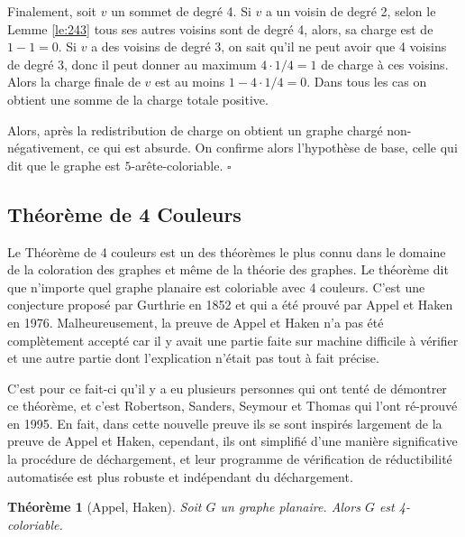 \documentclass[10pt,a4paper]{article}
\newtheorem{theorem}{Théorème}
\newcommand{\ep}{{\hfill $\square$}}
\begin{document}
Finalement, soit $v$ un sommet de degré 4. Si $v$ a un voisin de degré 2, selon le Lemme \ref{le:243} tous ses autres voisins sont de degré 4, alors, sa charge est de $1-1=0$. Si $v$ a des voisins de degré 3, on sait qu'il ne peut avoir que 4 voisins de degré 3, donc il peut donner au maximum $4 \cdot 1/4=1$ de charge à ces voisins. Alors la charge finale de $v$ est au moins $1 - 4\cdot 1/4 = 0$. Dans tous les cas on obtient une somme de la charge totale positive.

Alors, après la redistribution de charge on obtient un graphe chargé non-négativement, ce qui est absurde. On confirme alors l'hypothèse de base, celle qui dit que le graphe est $5$-arête-coloriable.
\ep 


\subsection{Théorème de 4 Couleurs}

Le Théorème de 4 couleurs est un des théorèmes le plus connu dans le domaine de la coloration des graphes et même de la théorie des graphes. Le théorème dit que n'importe quel graphe planaire est coloriable avec 4 couleurs. C'est une conjecture proposé par Gurthrie en 1852 et qui a été prouvé par Appel et Haken \cite{A&H} en 1976. Malheureusement, la preuve de Appel et Haken n'a pas été complètement accepté car il y avait une partie faite sur machine difficile à vérifier et une autre partie dont l'explication n'était pas tout à fait précise.

C'est pour ce fait-ci qu'il y a eu plusieurs personnes qui ont tenté de démontrer ce théorème, et c'est Robertson, Sanders, Seymour et Thomas \cite{T4C} qui l'ont ré-prouvé en 1995. En fait, dans cette nouvelle preuve ils se sont inspirés largement de la preuve de Appel et Haken, cependant, ils ont simplifié d'une manière significative la procédure de déchargement, et leur programme de vérification de réductibilité automatisée est plus robuste et indépendant du déchargement.

\begin{theorem}[Appel, Haken]
Soit $G$ un graphe planaire. Alors $G$ est 4-coloriable.
\label{th:4CT}
\end{theorem}
\end{document}
